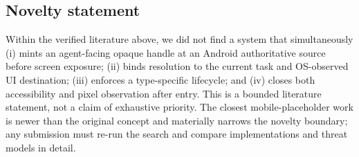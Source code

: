 \subsection{Novelty statement}

Within the verified literature above, we did not find a system that simultaneously (i) mints an agent-facing opaque handle at an Android authoritative source before screen exposure; (ii) binds resolution to the current task and OS-observed UI destination; (iii) enforces a type-specific lifecycle; and (iv) closes both accessibility and pixel observation after entry. This is a bounded literature statement, not a claim of exhaustive priority. The closest mobile-placeholder work is newer than the original concept and materially narrows the novelty boundary; any submission must re-run the search and compare implementations and threat models in detail.

